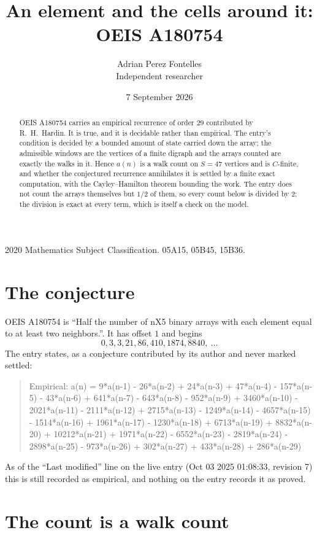 \documentclass[11pt,a4paper]{article}
\title{An element and the cells around it: OEIS A180754}
\author{Adrian Perez Fontelles\\ \small Independent researcher}
\date{7 September 2026}
\theoremstyle{plain}
\theoremstyle{definition}
\begin{document}
\maketitle

\begin{abstract}
OEIS A180754 carries an empirical recurrence of order $29$ contributed by R.~H.~Hardin. It is
true, and it is decidable rather than empirical. The entry's condition is decided by a bounded amount of state carried down the array; the
admissible windows are the vertices of a finite digraph and the arrays counted are exactly the
walks in it. Hence $a(n)$ is a walk count on $S=47$ vertices and is $C$-finite, and whether the
conjectured recurrence annihilates it is settled by a finite exact computation, with the
Cayley--Hamilton theorem bounding the work. The entry does not count the arrays themselves but $1/2$ of them, so every count below is divided by $2$; the division is exact at every term, which is itself a check on the model.
\end{abstract}

\noindent\small 2020 Mathematics Subject Classification. 05A15, 05B45, 15B36.\normalsize

\section{The conjecture}

OEIS A180754 is ``Half the number of nX5 binary arrays with each element equal to at least two neighbors.''. It has offset $1$ and begins
\[
0, 3, 3, 21, 86, 410, 1874, 8840,\ \dots
\]
The entry states, as a conjecture contributed by its author and never marked settled:
\begin{quote}
Empirical: a(n) = 9*a(n-1) - 26*a(n-2) + 24*a(n-3) + 47*a(n-4) - 157*a(n-5) - 43*a(n-6) + 641*a(n-7) - 643*a(n-8) - 952*a(n-9) + 3460*a(n-10) - 2021*a(n-11) - 2111*a(n-12) + 2715*a(n-13) - 1249*a(n-14) - 4657*a(n-15) - 1514*a(n-16) + 1961*a(n-17) - 1230*a(n-18) + 6713*a(n-19) + 8832*a(n-20) + 10212*a(n-21) + 1971*a(n-22) - 6552*a(n-23) - 2819*a(n-24) - 2898*a(n-25) - 973*a(n-26) + 302*a(n-27) + 433*a(n-28) + 286*a(n-29)
\end{quote}
As of the ``Last modified'' line on the live entry (Oct 03 2025 01:08:33, revision 7) this is still
recorded as empirical, and nothing on the entry records it as proved.

\section{The count is a walk count}
\end{document}
